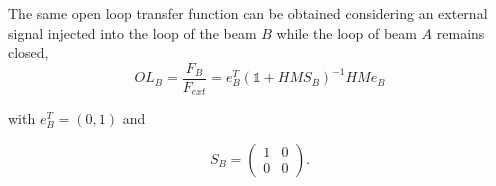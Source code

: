 The same open loop transfer function can be obtained considering an external signal injected into the loop of the beam $B$ while the loop of beam $A$ remains closed,
\begin{equation}
OL_{B}=\frac{F_{B}}{F_{ext}}=e_B^{T}(\mathds{1}+HMS_B)^{-1}HMe_B
\end{equation}

with $e_B^{T}=(0,1)$ and %

\begin{equation}
S_B=
\left( \begin{array}{cc}
1 & 0\\
0 & 0
\end{array} \right).
\end{equation}


